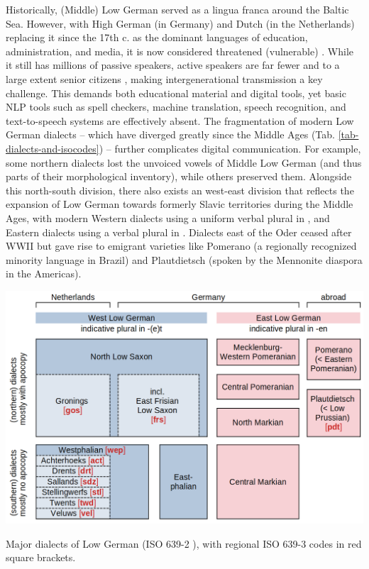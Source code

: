Historically, (Middle) Low German served as a lingua franca around the Baltic Sea. However, with High German (in Germany) and Dutch (in the Netherlands) replacing it since the 17th c. as the dominant languages of education, administration, and media, it is now considered threatened (vulnerable) \cite[p.25]{moseley2010atlas}. While it still has millions of passive speakers, active speakers are far fewer and to a large extent senior citizens \cite{AdlerEhlersGoltzetal.2019}, making intergenerational transmission a key challenge. This demands both educational material and digital tools, yet basic NLP tools such as spell checkers, machine translation, speech recognition, and text-to-speech systems are effectively absent. The fragmentation of modern Low German dialects -- which have diverged greatly since the Middle Ages (Tab. \ref{tab-dialects-and-isocodes}) -- further complicates digital communication. For example, some northern dialects lost the unvoiced vowels of Middle Low German (and thus parts of their morphological inventory), while others preserved them. Alongside this north-south division, there also exists an west-east division that reflects the expansion of Low German towards formerly Slavic territories during the Middle Ages, with modern Western dialects using a uniform verbal plural in , and Eastern dialects using a verbal plural in . Dialects east of the Oder ceased after WWII but gave rise to emigrant varieties like Pomerano (a regionally recognized minority language in Brazil) and Plautdietsch (spoken by the Mennonite diaspora in the Americas).

\begin{table}
    \centering
    \includegraphics[width=1.0\linewidth]{img/dialects-and-iso632-codes.png}
    \caption{Major dialects of Low German (ISO 639-2 ), with regional ISO 639-3 codes in red square brackets.}
    \label{tab-dialects-and-isocodes}
\end{table}

